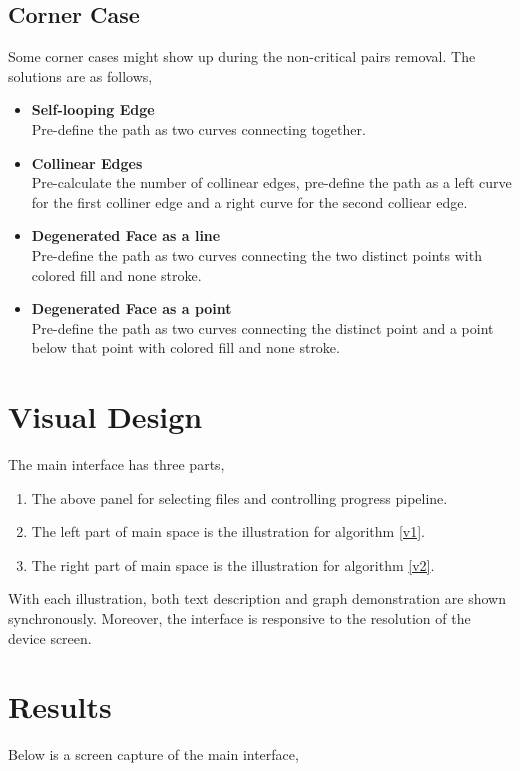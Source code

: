 \documentclass[12pt]{article}
\begin{document}
\subsection{Corner Case}
Some corner cases might show up during the non-critical pairs removal. The solutions are as follows,
\begin{itemize}
    \item \textbf{Self-looping Edge} \\
    Pre-define the path as two curves connecting together.
    \item \textbf{Collinear Edges} \\
    Pre-calculate the number of collinear edges, pre-define the path as a left curve for the first colliner edge and a right curve for the second colliear edge.
    \item \textbf{Degenerated Face as a line} \\
    Pre-define the path as two curves connecting the two distinct points with colored fill and none stroke.
    \item \textbf{Degenerated Face as a point} \\
    Pre-define the path as two curves connecting the distinct point and a point below that point with colored fill and none stroke.
\end{itemize}

\section{Visual Design}
The main interface has three parts,
\begin{enumerate}
    \item The above panel for selecting files and controlling progress pipeline.
    \item The left part of main space is the illustration for algorithm \ref{v1}.
    \item The right part of main space is the illustration for algorithm \ref{v2}.
\end{enumerate}
With each illustration, both text description and graph demonstration are shown synchronously. Moreover, the interface is responsive to the resolution of the device screen.

\section{Results}
Below is a screen capture of the main interface,
\begin{figure}[H]
\label{fig:name}
\end{figure}
\end{document}
